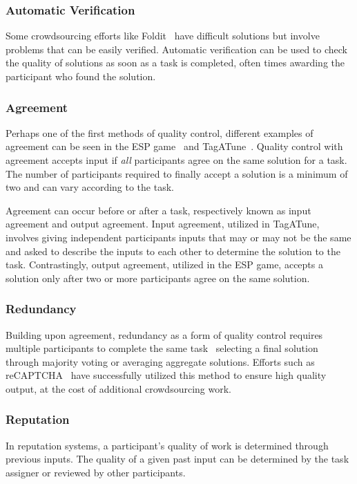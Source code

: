 \documentclass[10pt,twocolumn]{article}
\begin{document}
\subsubsection*{Automatic Verification}

Some crowdsourcing efforts like Foldit~\cite{Cooper2010} have difficult
solutions but involve problems that can be easily verified. Automatic
verification can be used to check the quality of solutions as soon
as a task is completed, often times awarding the participant who
found the solution.


\subsubsection*{Agreement}
Perhaps one of the first methods of quality control, different examples of 
agreement can be seen in the ESP game~\cite{VonAhn2004} and 
TagATune~\cite{Law2009a}. Quality control with agreement accepts input 
if \textit{all} participants agree on the same solution for a task.
The number of participants required to finally accept a solution is
a minimum of two and can vary according to the task.

Agreement can occur before or after a task, respectively
known as input agreement and output agreement. Input agreement, utilized in 
TagATune, involves giving independent participants inputs that may or 
may not be the same and asked to describe the inputs to each other to 
determine the solution to the task. Contrastingly, output agreement, 
utilized in the ESP game, accepts a solution only after two or more 
participants agree on the same solution.


\subsubsection*{Redundancy}
Building upon agreement, redundancy as a form of quality control requires 
multiple participants to complete the same task~\cite{Sheng2008} selecting
a final solution through majority voting or averaging aggregate solutions.
Efforts such as reCAPTCHA~\cite{VonAhn2008} have successfully utilized this 
method to ensure high quality output, at the cost of additional crowdsourcing
work.


\subsubsection*{Reputation}
In reputation systems, a participant's quality of work is determined through 
previous inputs. The quality of a given past input can be determined by the 
task assigner or reviewed by other participants.
\end{document}
